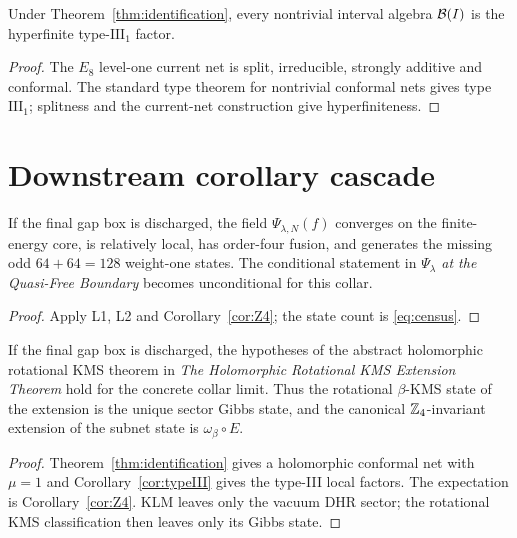 \begin{corollary}\label{cor:typeIII}
Under Theorem~\ref{thm:identification}, every nontrivial interval algebra
$\mathcal B(I)$ is the hyperfinite type-$\mathrm{III}_1$ factor.
\end{corollary}

\begin{proof}
The $E_8$ level-one current net is split, irreducible, strongly additive
and conformal.  The standard type theorem for nontrivial conformal nets
gives type $\mathrm{III}_1$; splitness and the current-net construction
give hyperfiniteness.
\end{proof}

\section{Downstream corollary cascade}

\begin{corollary}
If the final gap box is discharged, the field
$\Psi_{\lambda,N}(f)$ converges on the finite-energy core, is relatively
local, has order-four fusion, and generates the missing odd
$64+64=128$ weight-one states.  The conditional statement in
\emph{$\Psi_\lambda$ at the Quasi-Free Boundary} becomes unconditional
for this collar.
\end{corollary}

\begin{proof}
Apply L1, L2 and Corollary~\ref{cor:Z4}; the state count is
\eqref{eq:census}.
\end{proof}

\begin{corollary}
If the final gap box is discharged, the hypotheses of the abstract
holomorphic rotational KMS theorem in
\emph{The Holomorphic Rotational KMS Extension Theorem} hold for the
concrete collar limit.  Thus the rotational $\beta$-KMS state of the
extension is the unique sector Gibbs state, and the canonical
$\mathbb Z_4$-invariant extension of the subnet state is
$\omega_\beta\circ E$.
\end{corollary}

\begin{proof}
Theorem~\ref{thm:identification} gives a holomorphic conformal net with
$\mu=1$ and Corollary~\ref{cor:typeIII} gives the type-III local factors.
The expectation is Corollary~\ref{cor:Z4}.  KLM leaves only the vacuum
DHR sector; the rotational KMS classification then leaves only its Gibbs
state.
\end{proof}


